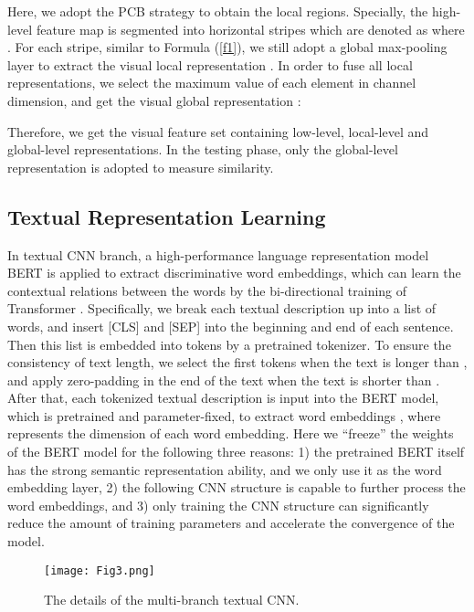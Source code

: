 \documentclass[review]{elsarticle}
\begin{document}
Here, we adopt the PCB \cite{2} strategy to obtain the local regions. Specially, the high-level feature map  is segmented into  horizontal stripes which are denoted as  where . For each stripe, similar to Formula (\ref{f1}), we still adopt a global max-pooling layer to extract the visual local representation . In order to fuse all local representations, we select the maximum value of each element in channel dimension, and get the visual global representation :

Therefore, we get the visual feature set  containing low-level, local-level and global-level representations. In the testing phase, only the global-level representation is adopted to measure similarity.

\subsection{Textual Representation Learning}
In textual CNN branch, a high-performance language representation model BERT \cite{26} is applied to extract discriminative word embeddings, which can learn the contextual relations between the words by the bi-directional training of Transformer \cite{49}. Specifically, we break each textual description  up into a list of words, and insert [CLS] and [SEP] into the beginning and end of each sentence. Then this list is embedded into tokens by a pretrained tokenizer. To ensure the consistency of text length, we select the first  tokens when the text is longer than , and apply zero-padding in the end of the text when the text is shorter than . After that, each tokenized textual description is input into the BERT model, which is pretrained and parameter-fixed, to extract word embeddings , where  represents the dimension of each word embedding. Here we “freeze” the weights of the BERT model for the following three reasons: 1) the pretrained BERT itself has the strong semantic representation ability, and we only use it as the word embedding layer, 2) the following CNN structure is capable to further process the word embeddings, and 3) only training the CNN structure can significantly reduce the amount of training parameters and accelerate the convergence of the model.

\begin{figure}[!t]
\centering
\texttt{[image: Fig3.png]}\\
\caption{The details of the multi-branch textual CNN.}
\label{fig3}
\end{figure}
\end{document}
